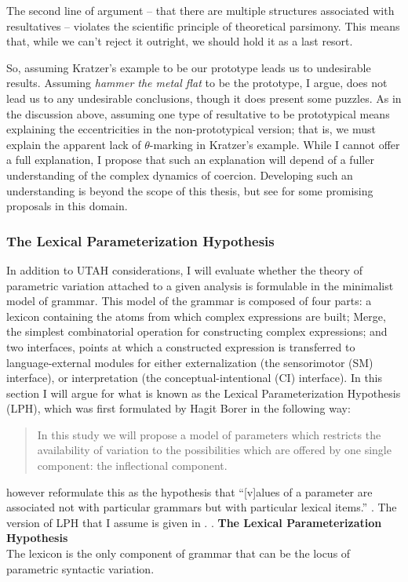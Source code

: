 \documentclass[MilwayThesis]{subfiles}
\begin{document}
The second line of argument -- that there are multiple structures associated with resultatives -- violates the scientific principle of theoretical parsimony.
This means that, while we can't reject it outright, we should hold it as a last resort.

So, assuming Kratzer's example to be our prototype leads us to undesirable results.
Assuming \textit{hammer the metal flat} to be the prototype, I argue, does not lead us to any undesirable conclusions, though it does present some puzzles.
As in the discussion above, assuming one type of resultative to be prototypical means explaining the eccentricities in the non-prototypical version;
that is, we must explain the apparent lack of $\theta$-marking in Kratzer's example.
While I cannot offer a full explanation, I propose that such an explanation will depend of a fuller understanding of the complex dynamics of coercion.
Developing such an understanding is beyond the scope of this thesis, but see \textcite{pustejovsky1998generative} for some promising proposals in this domain.

\subsubsection{The Lexical Parameterization Hypothesis}
In addition to UTAH considerations, I will evaluate whether the theory of parametric variation attached to a given analysis is formulable in the minimalist model of grammar.
This model of the grammar is composed of four parts:
	a lexicon containing the atoms from which complex expressions are built;
	Merge, the simplest combinatorial operation for constructing complex expressions; 
	and two interfaces, points at which a constructed expression is transferred to language-external modules for either externalization (the sensorimotor (SM) interface), or interpretation (the conceptual-intentional (CI) interface).
In this section I will argue for what is known as the Lexical Parameterization Hypothesis (LPH), which was first formulated by Hagit Borer in the following way:
\begin{quote}
	In this study we will propose a model of parameters which restricts the availability of variation to the possibilities which are offered by one single component: the inflectional component. \parencite[3]{borer1984parametric}
\end{quote}
\textcite{manzini1987parameters} however reformulate this as the hypothesis that ``[v]alues of a parameter are associated not with particular grammars but with particular lexical items.'' \parencite[424]{manzini1987parameters}.
The version of LPH that I assume is given in \Next.
\ex. \textbf{The Lexical Parameterization Hypothesis}\\
The lexicon is the only component of grammar that can be the locus of parametric syntactic variation.
\end{document}
